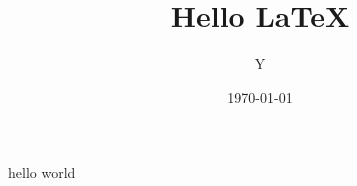 \documentclass[UTF8,a4paper,zihao=-4]{jnuart}%
\author{Y}
\title{Hello \LaTeX}
\date{\today}
\begin{document}
           
    \maketitle                                          %

    \tableofcontents                                    %


    
    
    


    


    
    
    hello world
\end{document}
